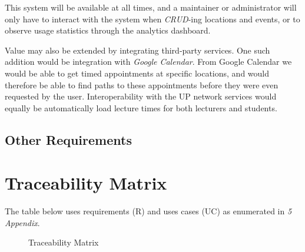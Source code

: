 \documentclass[12pt,a4paper]{article}
\begin{document}
			This system will be available at all times, and a maintainer or
			administrator will only have to interact with the system when
			\textit{CRUD}-ing locations and events, or to observe usage statistics
			through the analytics dashboard.

			\medskip

			Value may also be extended by integrating third-party services. One such
			addition would be integration with \textit{Google Calendar}. From Google
			Calendar we would be able to get timed appointments at specific locations,
			and would therefore be able to find paths to these appointments before
			they were even requested by the user. Interoperability with the UP network
			services would equally be automatically load lecture times for both
			lecturers and students.

		\subsection{Other Requirements}

	\section{Traceability Matrix}

	The table below uses requirements (R) and uses cases (UC) as enumerated in
	\textit{5 Appendix}.

	\begin{figure}[ht!]
		\caption \newline Traceability Matrix
	\end{figure}
\end{document}
